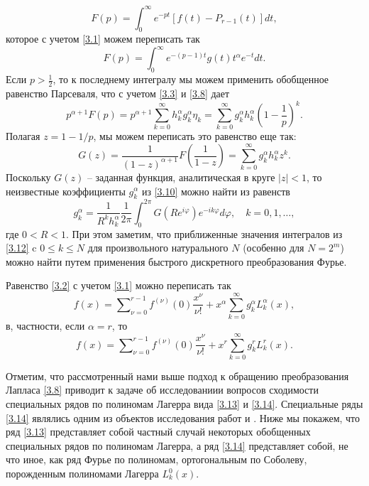 \begin{equation}\label{3.8}
F(p)=\int_0^\infty e^{-pt}\left[f(t)-P_{r-1}(t)\right]dt,
\end{equation}
которое с учетом \eqref{3.1} можем переписать так
\begin{equation}\label{3.9}
F(p)=\int_0^\infty e^{-(p-1)t} g(t)t^\alpha e^{-t}dt.
\end{equation}
Если $p>\frac12$, то к последнему интегралу мы можем применить обобщенное равенство Парсеваля, что с учетом \eqref{3.3} и \eqref{3.8} дает
\begin{equation}\label{3.10}
p^{\alpha+1}F(p)=p^{\alpha+1}\sum_{k=0}^\infty h_k^\alpha g_k^\alpha\eta_k=\sum_{k=0}^\infty g_k^\alpha h_k^\alpha\left(1-\frac1p\right)^k.
\end{equation}
Полагая $z=1-1/p$, мы можем переписать это равенство еще так:
\begin{equation}\label{3.11}
G(z)=\frac{1}{(1-z)^{\alpha+1}}F\left(\frac{1}{1-z}\right)=\sum_{k=0}^\infty g_k^\alpha h_k^\alpha z^k.
\end{equation}
Поскольку  $G(z)$ -- заданная функция, аналитическая в круге $|z|<1$,  то неизвестные коэффициенты $g_k^\alpha$ из \eqref{3.10} можно найти из равенств
\begin{equation}\label{3.12}
g_k^\alpha=\frac{1}{R^{k} h_k^\alpha}\frac{1}{2\pi}\int_0^{2\pi}G(Re^{i\varphi})e^{-ik\varphi}d\varphi, \quad k=0,1,\ldots,
\end{equation}
где $0<R<1$. При этом заметим, что приближенные значения интегралов из \eqref{3.12} c $0\le k\le N $ для произвольного натурального $N$ (особенно для $N=2^m$) можно найти путем применения быстрого дискретного преобразования Фурье.

Равенство \eqref{3.2} с учетом \eqref{3.1} можно переписать  так
\begin{equation}\label{3.13}
f(x)=\sum\nolimits_{\nu=0}^{r-1}f^{(\nu)}(0)\frac{x^\nu}{\nu!}+x^\alpha\sum_{k=0}^{\infty} g_k^\alpha L_k^\alpha(x),
\end{equation}
в, частности, если  $\alpha=r$, то
\begin{equation}\label{3.14}
f(x)=\sum\nolimits_{\nu=0}^{r-1}f^{(\nu)}(0)\frac{x^\nu}{\nu!}+x^r\sum_{k=0}^{\infty} g_k^r L_k^r(x).
\end{equation}

 Отметим, что рассмотренный нами выше подход к обращению преобразования  Лапласа \eqref{3.8} приводит к задаче об исследованиии вопросов сходимости  специальных рядов по полиномам Лагерра вида \eqref{3.13} и \eqref{3.14}. Специальные ряды \eqref{3.14} являлись одним из объектов исследования работ  \cite{Shar11} и \cite{Shar12}. Ниже мы покажем, что ряд \eqref{3.13} представляет собой частный случай некоторых обобщенных специальных рядов по полиномам Лагерра, а ряд \eqref{3.14} представляет собой, не что иное, как ряд Фурье по полиномам, ортогональным по Соболеву, порожденным полиномами Лагерра $L_k^0(x)$.














